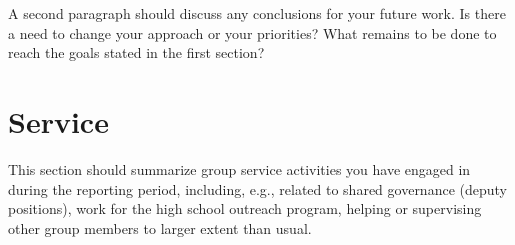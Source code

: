 \documentclass[11pt]{article}
\begin{document}
A second paragraph should discuss any conclusions for your future work. 
Is there a need to change your approach or your priorities? What remains
to be done to reach the goals stated in the first section? 

\section{Service}

This section should summarize group service activities you have engaged
in during the reporting period, including, e.g., related to shared
governance (deputy positions), work for the high school outreach
program, helping or supervising other group members to larger extent
than usual.

\printbibliography
\end{document}
